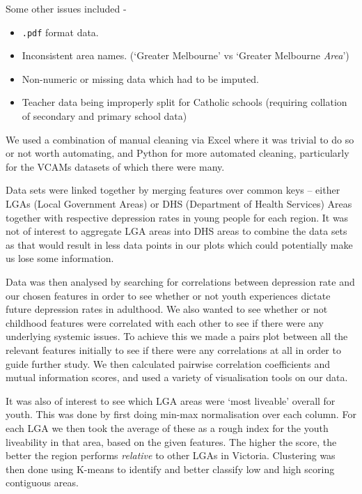 \documentclass[a4, 11pt]{article}
\begin{document}
Some other issues included -

\begin{itemize}
    \item \verb|.pdf| format data.
    \item Inconsistent area names. (`Greater Melbourne' vs `Greater Melbourne \textit{Area}')
    \item Non-numeric or missing data which had to be imputed.
    \item Teacher data being improperly split for Catholic schools (requiring collation of secondary and primary school data)
\end{itemize}

We used a combination of manual cleaning via Excel where it was trivial to do so or not worth automating, and Python for more automated cleaning, particularly for the VCAMs datasets of which there were many.

Data sets were linked together by merging features over common keys – either LGAs (Local Government Areas) or DHS (Department of Health Services) Areas together with respective depression rates in young people for each region. It was not of interest to aggregate LGA areas into DHS areas to combine the data sets as that would result in less data points in our plots which could potentially make us lose some information. 

Data was then analysed by searching for correlations between depression rate and our chosen features in order to see whether or not youth experiences dictate future depression rates in adulthood. We also wanted to see whether or not childhood features were correlated with each other to see if there were any underlying systemic issues. To achieve this we made a pairs plot between all the relevant features initially to see if there were any correlations at all in order to guide further study. We then calculated pairwise correlation coefficients and mutual information scores, and used a variety of visualisation tools on our data. 

It was also of interest to see which LGA areas were `most liveable’ overall for youth. This was done by first doing min-max normalisation over each column. For each LGA we then took the average of these as a rough index for the youth liveability in that area, based on the given features. The higher the score, the better the region performs \emph{relative} to other LGAs in Victoria. Clustering was then done using K-means to identify and better classify low and high scoring contiguous areas. 
\end{document}
